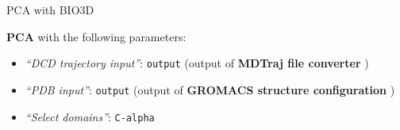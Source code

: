 \documentclass[twocolumn]{bmcart}%
\providecommand{\tightlist}{%
  \setlength{\itemsep}{0pt}\setlength{\parskip}{0pt}}
\begin{document}
\begin{handson_box_colour}{PCA with BIO3D}


  \textbf{PCA} with the following parameters:

  \begin{itemize}
  \tightlist
  \item
    \emph{``DCD trajectory input''}: \texttt{output} (output of
    \textbf{MDTraj file converter} )
  \item
    \emph{``PDB input''}: \texttt{output} (output of \textbf{GROMACS
    structure configuration} )
  \item
    \emph{``Select domains''}: \texttt{C-alpha}
  \end{itemize}

\end{handson_box_colour}
\end{document}
